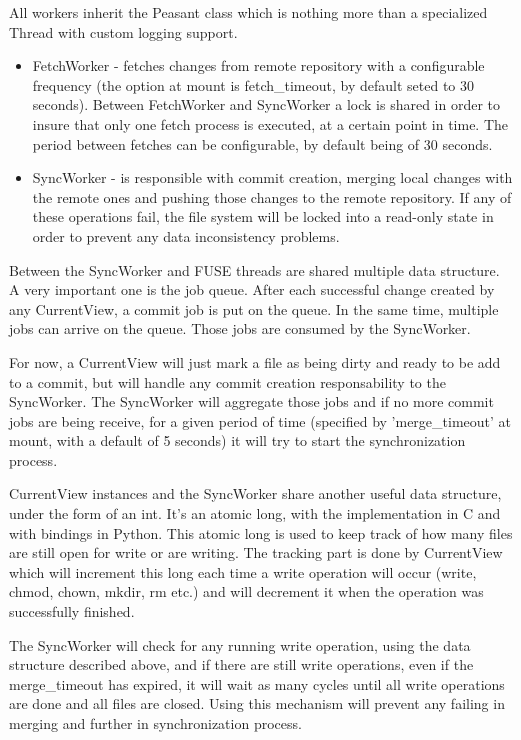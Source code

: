All workers inherit the Peasant class which is nothing more than a specialized Thread with custom logging support.
\begin{itemize}
    \item FetchWorker - fetches changes from remote repository with a configurable frequency (the option at mount is fetch\_timeout, by default seted to 30 seconds). Between FetchWorker and SyncWorker a lock is shared in order to insure that only one fetch process is executed, at a certain point in time. The period between fetches can be configurable, by default being of 30 seconds.
    \item SyncWorker - is responsible with commit creation, merging local changes with the remote ones and pushing those changes to the remote repository. If any of these operations fail, the file system will be locked into a read-only state in order to prevent any data inconsistency problems.
\end{itemize}

Between the SyncWorker and FUSE threads are shared multiple data structure. A very important one is the job queue. After each successful change created by any CurrentView, a commit job is put on the queue. In the same time, multiple jobs can arrive on the queue. Those jobs are consumed by the SyncWorker.

For now, a CurrentView will just mark a file as being dirty and ready to be add to a commit, but will handle any commit creation responsability to the SyncWorker. The SyncWorker will aggregate those jobs and if no more commit jobs are being receive, for a given period of time (specified by 'merge\_timeout' at mount, with a default of 5 seconds) it will try to start the synchronization process.

CurrentView instances and the SyncWorker share another useful data structure, under the form of an int. It's an atomic long, with the implementation in C and with bindings in Python. This atomic long is used to keep track of how many files are still open for write or are writing. The tracking part is done by CurrentView which will increment this long each time a write operation will occur (write, chmod, chown, mkdir, rm etc.) and will decrement it when the operation was successfully finished.

The SyncWorker will check for any running write operation, using the data structure described above, and if there are still write operations, even if the merge\_timeout has expired, it will wait as many cycles until all write operations are done and all files are closed. Using this mechanism will prevent any failing in merging  and further in synchronization process.

